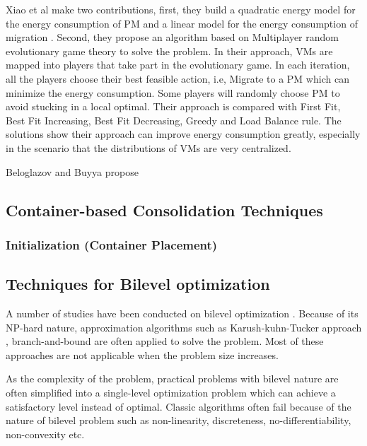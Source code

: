 Xiao et al \cite{Xiao:2015ik} make two contributions, first, they build a quadratic energy model for the energy consumption of PM and a linear model for the energy consumption of migration \cite{Liu:2013kl}. Second, they propose an algorithm based on Multiplayer random evolutionary game theory to solve the problem. In their approach, VMs are mapped into players that take part in the evolutionary game. In each iteration, all the players choose their best feasible action, i.e, Migrate to a PM which can minimize the energy consumption. Some players will randomly choose PM to avoid stucking in a local optimal. Their approach is compared with First Fit, Best Fit Increasing, Best Fit Decreasing, Greedy and Load Balance rule. The solutions show their approach can improve energy consumption greatly, especially in the scenario that the distributions of VMs are very centralized.

Beloglazov and Buyya \cite{Beloglazov:2012bw} propose

\subsection{Container-based Consolidation Techniques}
\subsubsection{Initialization (Container Placement)}
\subsection{Techniques for Bilevel optimization}

A number of studies have been conducted on bilevel optimization \cite{Colson:2007bu,Dempe:2006jc}. Because of its NP-hard nature, approximation algorithms such as Karush-kuhn-Tucker approach \cite{Bianco:2009ej, Herskovits:2000be}, branch-and-bound \cite{Bard:1982gs} are often applied to solve the problem. Most of these approaches are not applicable when the problem size increases.

As the complexity of the problem, practical problems with bilevel nature are often simplified into a single-level optimization problem which can achieve a satisfactory level instead of optimal. Classic algorithms often fail because of the nature of bilevel problem such as non-linearity, discreteness, no-differentiability, non-convexity etc.


